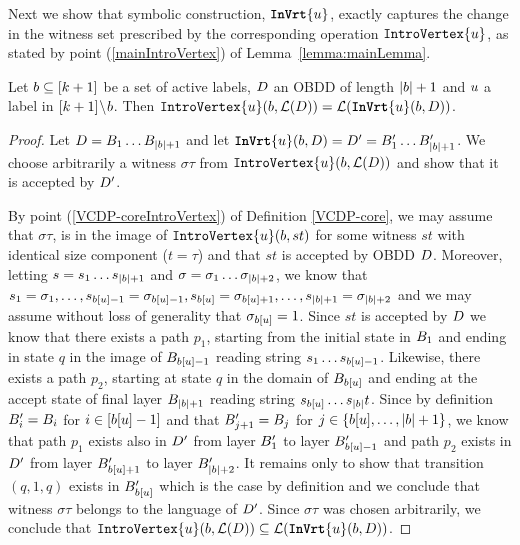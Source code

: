Next we show that symbolic construction, $\texttt{\textbf{InVrt}}\{u\}$, exactly captures the change in the witness set prescribed by the corresponding operation $\texttt{IntroVertex}\{u\}$, as stated by point (\ref{mainIntroVertex}) of Lemma~\ref{lemma:mainLemma}.

\begin{lemma}
\label{lemma:IntroVertexAppendix}
Let $b \subseteq [k+1]$ be a set of active labels, $D$ an OBDD of length $|b|+1$ and $u$ a label in $[k+1]\negthinspace\setminus \negthinspace b$. Then  $\texttt{IntroVertex}\{u\}(b, \mathcal{L}(D))  = \mathcal{L}(\texttt{\textbf{InVrt}}\{u\}(b, D))$.
\end{lemma}
\begin{proof}
Let $D = B_1\dots B_{|b|+1}$ and let $\texttt{\textbf{InVrt}}\{u\}(b, D)= D' = B'_1\dots B'_{|b|+1}$.
We choose arbitrarily a witness $\sigma\tau$ from $\texttt{IntroVertex}\{u\}(b,\mathcal{L}(D))$ and show that it is accepted by $D'$. 

By point (\ref{VCDP-coreIntroVertex}) of Definition \ref{VCDP-core}, we may assume that $\sigma\tau$, is in the image of $\texttt{IntroVertex}\{u\}(b, st)$ for some witness $st$ with identical size component ($t=\tau$) and that $st$ is accepted by OBDD $D$. Moreover, letting $s = s_1\dots s_{|b| +1}$ and $\sigma = \sigma_1 \dots \sigma_{|b|+2}$, we know that $s_1 = \sigma_1, \ldots, s_{b[u]-1} = \sigma_{b[u]-1}, s_{b[u]} = \sigma_{b[u]+1}, \ldots, s_{|b| + 1} = \sigma_{|b|+2}$ and we may assume without loss of generality that $\sigma_{b[u]} = 1$. Since $st$ is accepted by $D$ we know that there exists a path $p_1$, starting from the initial state in $B_1$ and ending in state $q$ in the image of $B_{b[u]-1}$ reading string $s_1\dots s_{b[u]-1}$. Likewise, there exists a path $p_2$, starting at state $q$ in the domain of $B_{b[u]}$ and ending at the accept state of final layer $B_{|b|+1}$ reading string $s_{b[u]}\dots s_{|b|}t$. 
Since by definition  $B'_i =B_i$ for $i \in [b[u]-1]$ and that $ B'_{j+1}=B_j$ for $j \in \{b[u], \ldots, |b|+1\}$, we know that path $p_1$ exists also in $D'$ from layer $B'_1$ to layer $B'_{b[u] - 1}$ and path $p_2$ exists in $D'$ from layer $B'_{b[u]+1}$ to layer $B'_{|b|+2}$. It remains only to show that transition $(q,1,q)$ exists in $B'_{b[u]}$ which is the case by definition and we conclude that witness $\sigma\tau$ belongs to the language of $D'$. Since $\sigma\tau$ was chosen arbitrarily, we conclude that $\texttt{IntroVertex}\{u\}(b, \mathcal{L}(D))\subseteq \mathcal{L}(\texttt{\textbf{InVrt}}\{u\}(b,D))$.


\end{proof}
